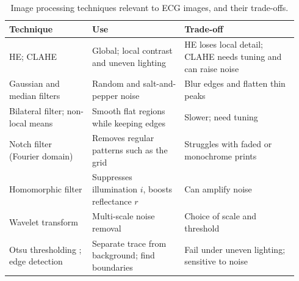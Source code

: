 \documentclass[12pt,nonacm,acmlarge,titlepage,screen]{acmart}
\begin{document}
\begin{table}[H]
  \centering
  \footnotesize
  \renewcommand{\arraystretch}{1.0}
  \caption{Image processing techniques relevant to ECG images, and their trade-offs.}
  \label{tab:techniques}
  \begin{tabular}{@{}P{0.27\linewidth} P{0.30\linewidth} P{0.37\linewidth}@{}}
    \toprule
    \textbf{Technique} & \textbf{Use} & \textbf{Trade-off} \\
    \midrule
    HE; CLAHE \cite{pizer_adaptive_1987,zuiderveld_contrast_1994} & Global; local contrast and uneven lighting & HE loses local detail; CLAHE needs tuning and can raise noise \\
    Gaussian and median filters \cite{gonzalez_digital_2018} & Random and salt-and-pepper noise & Blur edges and flatten thin peaks \\
    Bilateral filter; non-local means \cite{tomasi_bilateral_1998,buades_non-local_2005} & Smooth flat regions while keeping edges & Slower; need tuning \\
    Notch filter (Fourier domain) \cite{gonzalez_digital_2018} & Removes regular patterns such as the grid & Struggles with faded or monochrome prints \\
    Homomorphic filter \cite{stockham_image_1972} & Suppresses illumination $i$, boosts reflectance $r$ & Can amplify noise \\
    Wavelet transform \cite{lepcha_deep_2023} & Multi-scale noise removal & Choice of scale and threshold \\
    Otsu thresholding \cite{otsu_threshold_1979}; edge detection \cite{canny_computational_1986} & Separate trace from background; find boundaries & Fail under uneven lighting; sensitive to noise \\
    \bottomrule
  \end{tabular}
\end{table}
\end{document}

